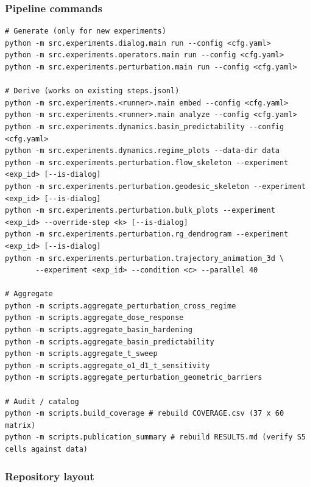 \documentclass{article}
\newenvironment{codeblock}[1][]{%
  \par\addvspace{2pt}%
  \ifstrempty{#1}{}{\noindent\textit{\small #1}\par\nobreak\addvspace{2pt}}%
  \begingroup\footnotesize\begin{mdframed}[style=codestyle]%
}{%
  \end{mdframed}\endgroup\par%
}
\theoremstyle{plain}
\theoremstyle{definition}
\begin{document}
\subsubsection*{Pipeline commands}

\begin{codeblock}
\begin{verbatim}
# Generate (only for new experiments)
python -m src.experiments.dialog.main run --config <cfg.yaml>
python -m src.experiments.operators.main run --config <cfg.yaml>
python -m src.experiments.perturbation.main run --config <cfg.yaml>

# Derive (works on existing steps.jsonl)
python -m src.experiments.<runner>.main embed --config <cfg.yaml>
python -m src.experiments.<runner>.main analyze --config <cfg.yaml>
python -m src.experiments.dynamics.basin_predictability --config <cfg.yaml>
python -m src.experiments.dynamics.regime_plots --data-dir data
python -m src.experiments.perturbation.flow_skeleton --experiment <exp_id> [--is-dialog]
python -m src.experiments.perturbation.geodesic_skeleton --experiment <exp_id> [--is-dialog]
python -m src.experiments.perturbation.bulk_plots --experiment <exp_id> --override-step <k> [--is-dialog]
python -m src.experiments.perturbation.rg_dendrogram --experiment <exp_id> [--is-dialog]
python -m src.experiments.perturbation.trajectory_animation_3d \
       --experiment <exp_id> --condition <c> --parallel 40

# Aggregate
python -m scripts.aggregate_perturbation_cross_regime
python -m scripts.aggregate_dose_response
python -m scripts.aggregate_basin_hardening
python -m scripts.aggregate_basin_predictability
python -m scripts.aggregate_t_sweep
python -m scripts.aggregate_o1_d1_t_sensitivity
python -m scripts.aggregate_perturbation_geometric_barriers

# Audit / catalog
python -m scripts.build_coverage # rebuild COVERAGE.csv (37 x 60 matrix)
python -m scripts.publication_summary # rebuild RESULTS.md (verify S5 cells against data)
\end{verbatim}
\end{codeblock}

\subsubsection*{Repository layout}
\end{document}
